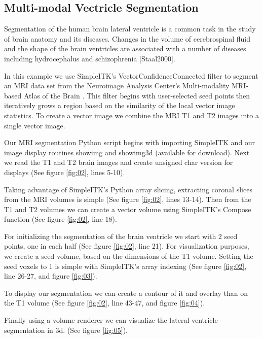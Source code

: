 \documentclass{frontiersMED} %
\begin{document}
\subsection{Multi-modal Vectricle Segmentation}
Segmentation of the human brain lateral ventricle is a common task in the
study of brain anatomy and its diseases.  Changes in the volume of
cerebrospinal fluid and the shape of the brain ventricles are
associated with a number of diseases including hydrocephalus
\cite{Brandt1994} and schizophrenia [Staal2000].

In this example we use SimpleITK's VectorConfidenceConnected filter
\cite{Ibanez2005} to segment an MRI data set from the Neuroimage Analysis
Center's Multi-modality MRI-based Atlas of the Brain \cite{Halle2013}.
This filter begins with user-selected seed points then iteratively
grows a region based on the similarity of the local vector image
statistics.  To create a vector image we combine the MRI T1 and T2
images into a single vector image.

Our MRI segmentation Python script begins with importing SimpleITK and
our image display routines showimg and showimg3d (available for
download).  Next we read the T1 and T2 brain images and create unsigned char
version for displays (See figure \ref{fig:02}, lines 5-10).

Taking advantage of SimpleITK's Python array slicing, extracting
coronal slices from the MRI volumes is simple (See figure \ref{fig:02}, lines 13-14).  
Then from the T1 and T2 volumes we can create a vector volume using
SimpleITK's Compose function (See figure \ref{fig:02}, line 18).


For initializing the segmentation of the brain ventricle we start with
2 seed points, one in each half (See figure \ref{fig:02}, line 21). 
For visualization purposes, we create
a seed volume, based on the dimensions of the T1 volume.  Setting the
seed voxels to 1 is simple with SimpleITK's array indexing  (See
figure \ref{fig:02}, line 26-27, and figure \ref{fig:03}).

To display our segmentation we can create a contour of it and overlay
than on the T1 volume (See figure \ref{fig:02}, line 43-47, and figure \ref{fig:04}).

Finally using a volume renderer we can visualize the lateral ventricle
segmentation in 3d.  (See figure \ref{fig:05}).


\end{document}
